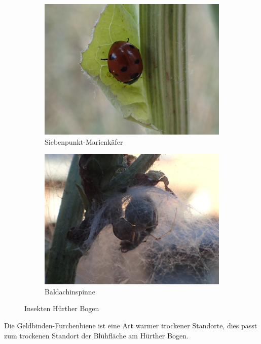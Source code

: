 \documentclass[10pt]{article}
\begin{document}
\begin{figure}[h!]
\begin{subfigure}[b]{0.44\linewidth}
    \includegraphics[width=\linewidth]{img/bogen/siebenpunkt.jpg}
    \caption{Siebenpunkt-Marienkäfer}
  \end{subfigure}
  \begin{subfigure}[b]{0.44\linewidth}
    \includegraphics[width=\linewidth]{img/bogen/trapezspinne.jpg}
    \caption{Baldachinspinne}
  \end{subfigure}
  \caption{Insekten Hürther Bogen}
\end{figure}

Die Geldbinden-Furchenbiene ist eine Art warmer trockener Standorte, dies passt zum trockenen Standort der Blühfläche am Hürther Bogen.

\clearpage
\end{document}
